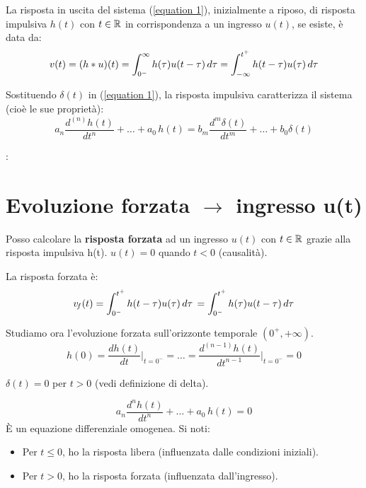 	La risposta in uscita del sistema (\ref{equation 1}), inizialmente a riposo, di risposta impulsiva $h(t)$ con $ t\in\mathbb{R}$ in corrispondenza a un ingresso $u(t)$, se esiste, è data da:
	\[
	v(t)=(h*u)(t) = \int_{0^-}^{\infty}h(\tau)u(t - \tau)\, d\tau
	= \int_{-\infty}^{t^+}h(t - \tau)u(\tau)\, d\tau
	\]
	
	\begin{NB}
	 Sostituendo $\delta (t)$ in (\ref{equation 1}), la risposta impulsiva caratterizza il sistema (cioè le sue proprietà):
	\begin{equation}
		a_n\frac{d^{(n)}h(t)}{dt^n}+\dots+a_0\,h(t)
		=b_m\frac{d^{m}\delta(t)}{dt^{m}}+\dots+b_0 \delta(t)
	\tag{7}\label{equation 7}
	\end{equation}
	\end{NB}:

\section{Evoluzione forzata $ \rightarrow $ ingresso u(t)}

	Posso calcolare la \textbf{risposta forzata} ad un ingresso $u(t)$ con $ t\in\mathbb{R} $ grazie alla risposta impulsiva h(t). $ u(t)=0 $ quando $ t<0$ (causalità).
	
	La risposta forzata è:	
	\[
	v\!_f(t) =
	\int_{0^-}^{t^+}h(t - \tau)u(\tau)\, d\tau 
	\,= 
	\int_{0^-}^{t^+}h(\tau)u(t - \tau)\, d\tau 
	\]
	
	Studiamo ora l'evoluzione forzata sull'orizzonte temporale $(0^+,+\infty)$.
	\begin{equation*}
		h(0) = \frac{dh(t)}{dt}\bigg\vert_{t=0^-} = \dots 
		=\frac{d^{(n-1)}h(t)}{dt^{n-1}}\bigg\vert_{t=0^-}
		= 0
	\end{equation*}
	
	\begin{NB}
		 $ \delta(t) = 0$ per $ t >0$ (vedi definizione di delta).
	\end{NB}

	\begin{equation}
	 a_n \frac{d^{n} h(t)}{dt^n}+\dots+a_0\,h(t) = 0
	\tag{8}\label{equation 8}
	\end{equation}
	È un equazione differenziale omogenea. Si noti:
	\begin{itemize}
		\item Per $ t\leq0 $, ho la risposta libera (influenzata dalle condizioni iniziali).
		\item Per $ t>0 $, ho la risposta forzata (influenzata dall'ingresso).
	\end{itemize}

